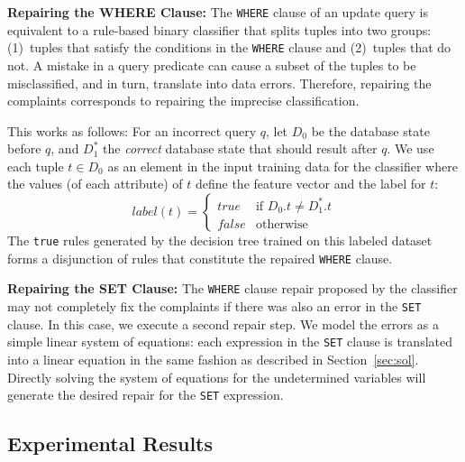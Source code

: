 \noindent
\textbf{Repairing the WHERE Clause:}
The \texttt{WHERE} clause of an update query is equivalent to a
rule-based binary classifier that splits tuples into two groups:
(1)~tuples that satisfy the conditions in the \texttt{WHERE} clause
and (2)~tuples that do not. A mistake in a query predicate can 
cause a subset of the tuples to be misclassified, and in turn,
translate into data errors. 
Therefore, repairing the complaints corresponds to repairing the imprecise classification. 

This works as follows: For an incorrect query $q$, let
$D_0$ be the database state before $q$, and $D_1^*$ the \emph{correct}
database state that should result after $q$.
We use each tuple $t \in D_0$ as an element in the input training data
for the classifier where the values (of each attribute) of $t$ define
the feature vector and the label for $t$:
	\[
    label(t)= 
    \begin{cases}
    true & \textrm{if\ }D_0.t \neq D_1^*.t\\
    false              & \text{otherwise}
    \end{cases}
\]
The \texttt{true} rules generated by the decision tree trained on this labeled dataset 
forms a disjunction of rules that constitute the repaired \texttt{WHERE} clause.


\noindent
\textbf{Repairing the SET Clause:}
The \texttt{WHERE} clause repair proposed by the classifier may not completely fix 
the complaints if there was also an error in the \texttt{SET} clause. 
In this case, we execute a second repair step.
We model the errors as a simple linear system of equations: 
each expression in the \texttt{SET} clause is translated into a
linear equation in the same fashion as described in Section~\ref{sec:sol}.
Directly solving the system of equations for the undetermined variables 
will generate the desired repair for the \texttt{SET} expression.

\subsection{Experimental Results}


